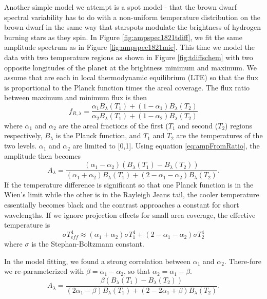 \documentclass[twocolumn]{aastex6}
\begin{document}
Another simple model we attempt is a spot model - that the brown dwarf spectral variability has to do with a non-uniform temperature distribution on the brown dwarf in the same way that starspots modulate the brightness of hydrogen burning stars as they spin.
In Figure \ref{fig:ampspec1821tdiff}, we fit the same amplitude spectrum as in Figure \ref{fig:ampspec1821mie}.
This time we model the data with two temperature regions as shown in Figure \ref{fig:tdiffschem} with two opposite longitudes of the planet at the brightness minimum and maximum.
We assume that are each in local thermodynamic equilibrium (LTE) so that the flux is proportional to the Planck function times the areal coverage.
The flux ratio between maximum and minimum flux is then
\begin{equation}
f_{R,\lambda} = \frac{\alpha_1 B_\lambda(T_1) + (1-\alpha_1) B_\lambda(T_2)}{\alpha_2 B_\lambda(T_1) + (1-\alpha_2) B_\lambda(T_2)}
\end{equation}
where $\alpha_1$ and $\alpha_2$ are the areal fractions of the first ($T_1$ and second ($T_2$) regions respectively, $B_\lambda$ is the Planck function, and $T_1$ and $T_2$ are the temperatures of the two levels.
$\alpha_1$ and $\alpha_2$ are limited to [0,1].
Using equation \ref{eq:ampFromRatio}, the amplitude then becomes
\begin{equation}\label{eq:twoTempAmpAlphas}
A_\lambda = \frac{\left(\alpha_1 - \alpha_2 \right) \left(B_\lambda(T_1) - B_\lambda(T_2) \right)}{\left(\alpha_1 + \alpha_2\right) B_\lambda(T_1) + \left(2 - \alpha_1 - \alpha_2\right) B_\lambda(T_2)}.
\end{equation}
If the temperature difference is significant so that one Planck function is in the Wien's limit while the other is in the Rayleigh Jeans tail, the cooler temperature essentially becomes black and the contrast approaches a constant for short wavelengths.
If we ignore projection effects for small area coverage, the effective temperature is 
\begin{equation}
\sigma T_{eff}^4 \approx (\alpha_1 + \alpha_2) \sigma T_1^4 + (2 - \alpha_1 - \alpha_2) \sigma T_2^4
\end{equation}
where $\sigma$ is the Stephan-Boltzmann constant.

In the model fitting, we found a strong correlation between $\alpha_1$ and $\alpha_2$.
There-fore we re-parameterized with $\beta = \alpha_1 - \alpha_2$, so that $\alpha_2 = \alpha_1 - \beta$.
\begin{equation}\label{eq:twoTempAmp}
A_\lambda = \frac{\beta \left(B_\lambda(T_1) - B_\lambda(T_2) \right)}{\left(2 \alpha_1 - \beta \right) B_\lambda(T_1) + \left(2 - 2 \alpha_1 + \beta \right) B_\lambda(T_2)}.
\end{equation}
\end{document}
